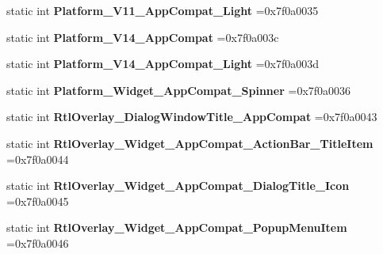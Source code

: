 \begin{DoxyCompactItemize}
static int {\bfseries Platform\+\_\+\+V11\+\_\+\+App\+Compat\+\_\+\+Light} =0x7f0a0035
\item 
\mbox{\label{classandroid_1_1support_1_1v4_1_1R_1_1style_ac9798dc588aca824acc2db183c4d90b5}} 
static int {\bfseries Platform\+\_\+\+V14\+\_\+\+App\+Compat} =0x7f0a003c
\item 
\mbox{\label{classandroid_1_1support_1_1v4_1_1R_1_1style_a52184a4a5a2b98ad59b7e108d2db32d4}} 
static int {\bfseries Platform\+\_\+\+V14\+\_\+\+App\+Compat\+\_\+\+Light} =0x7f0a003d
\item 
\mbox{\label{classandroid_1_1support_1_1v4_1_1R_1_1style_aa6b5f9e4f0dab2a953b69deda012537c}} 
static int {\bfseries Platform\+\_\+\+Widget\+\_\+\+App\+Compat\+\_\+\+Spinner} =0x7f0a0036
\item 
\mbox{\label{classandroid_1_1support_1_1v4_1_1R_1_1style_a3acb571d0c31e891214220a422b7ce4e}} 
static int {\bfseries Rtl\+Overlay\+\_\+\+Dialog\+Window\+Title\+\_\+\+App\+Compat} =0x7f0a0043
\item 
\mbox{\label{classandroid_1_1support_1_1v4_1_1R_1_1style_af89eedf51bcce036c69a8000a2b3b529}} 
static int {\bfseries Rtl\+Overlay\+\_\+\+Widget\+\_\+\+App\+Compat\+\_\+\+Action\+Bar\+\_\+\+Title\+Item} =0x7f0a0044
\item 
\mbox{\label{classandroid_1_1support_1_1v4_1_1R_1_1style_af8f417331c8baa83808584fc93210cd8}} 
static int {\bfseries Rtl\+Overlay\+\_\+\+Widget\+\_\+\+App\+Compat\+\_\+\+Dialog\+Title\+\_\+\+Icon} =0x7f0a0045
\item 
\mbox{\label{classandroid_1_1support_1_1v4_1_1R_1_1style_aaa29ceb8c607125f1005e16f7c9601b1}} 
static int {\bfseries Rtl\+Overlay\+\_\+\+Widget\+\_\+\+App\+Compat\+\_\+\+Popup\+Menu\+Item} =0x7f0a0046
\item 
\mbox{\label{classandroid_1_1support_1_1v4_1_1R_1_1style_a22f3af78c2466f5e5b5a0d2d14756148}} 

\end{DoxyCompactItemize}

